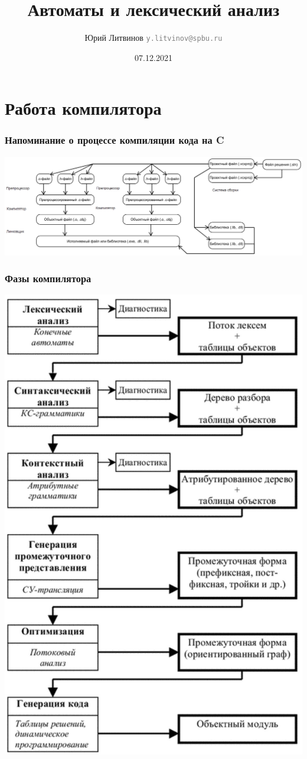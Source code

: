\documentclass[xetex,mathserif,serif]{beamer}
\title{Автоматы и лексический анализ}
\author[Юрий Литвинов]{Юрий Литвинов \newline \textcolor{gray}{\small\texttt{y.litvinov@spbu.ru}}}
\date{07.12.2021}
\begin{document}
    
    \frame{\titlepage}

    \section{Работа компилятора}

    \begin{frame}
        \frametitle{Напоминание о процессе компиляции кода на C}
        \begin{center}
            \includegraphics[height=0.4\textheight]{compilation.png}
        \end{center}
    \end{frame}

    \begin{frame}
        \frametitle{Фазы компилятора}
        \begin{center}
            \includegraphics[height=0.8\textheight]{compilerPhases.png}
        \end{center}
    \end{frame}
\end{document}
